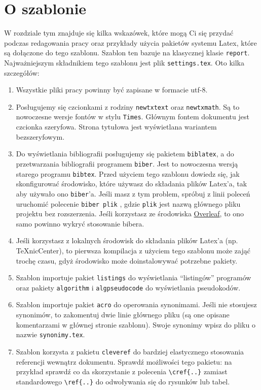 \chapter{O szablonie}
\label{chapt:Przyklady}

W rozdziale tym znajduje się kilka wskazówek, które mogą Ci się przydać podczas redagowania pracy 
oraz przykłady użycia pakietów systemu Latex, które są dołączone do tego szablonu. 
Szablon ten bazuje na klasycznej klasie \texttt{report}. Najważniejszym składnikiem tego szablonu jest plik \texttt{settings.tex}. 
Oto kilka szczegółów:
\begin{enumerate}

\item Wszystkie pliki pracy powinny być zapisane w formacie utf-8.

\item Posługujemy się czcionkami z rodziny \texttt{newtxtext} oraz \texttt{newtxmath}. Są to nowoczesne wersje fontów w stylu \texttt{Times}. Głównym fontem dokumentu jest czcionka szeryfowa. Strona tytułowa jest wyświetlana wariantem bezszeryfowym. 

\item Do wyświetlania bibliografii posługujemy się pakietem \texttt{biblatex},
a do przetwarzania bibliografii programem \texttt{biber}. Jest to   nowoczesna wersją starego programu \texttt{bibtex}. Przed użyciem tego szablonu dowiedz się, jak skonfigurować środowisko, które używasz do składania plików Latex'a, tak aby używało ono \texttt{biber}'a. Jeśli masz z tym problem, spróbuj z linii poleceń uruchomić polecenie \texttt{biber plik} , gdzie \texttt{plik} jest nazwą głównego  pliku projektu bez rozszerzenia. 
Jeśli korzystasz ze środowiska \href{https://www.overleaf.com/}{Overleaf}, to ono samo powinno wykryć stosowanie bibera.

\item Jeśli korzystasz z lokalnych środowisk do składania plików Latex'a (np. TeXnicCenter), to pierwsza kompilacja z użyciem tego szablonu może zająć trochę czasu, gdyż środowisko może doinstalowywać potrzebne pakiety.
  
\item Szablon importuje pakiet \texttt{listings} do wyświetlania ``listingów'' programów oraz  pakiety \texttt{algorithm} i \texttt{algpseudocode} do wyświetlania pseudokodów. 

\item Szablon importuje pakiet \texttt{acro} do operowania synonimami. Jeśli nie stosujesz synonimów, to zakomentuj dwie linie głównego pliku (są one opisane komentarzami w głównej stronie szablonu). Swoje synonimy wpisz do pliku o nazwie \texttt{synonimy.tex}. 

\item Szablon korzysta z pakietu \texttt{cleveref} do bardziej elastycznego stosowania referencji wewnątrz dokumentu. Sprawdź możliwości tego pakietu: na przykład sprawdź co da skorzystanie z polecenia \verb|\cref{..}| 
zamiast standardowego \verb|\ref{..}| do odwoływania się do rysunków lub tabel.  
\end{enumerate}


